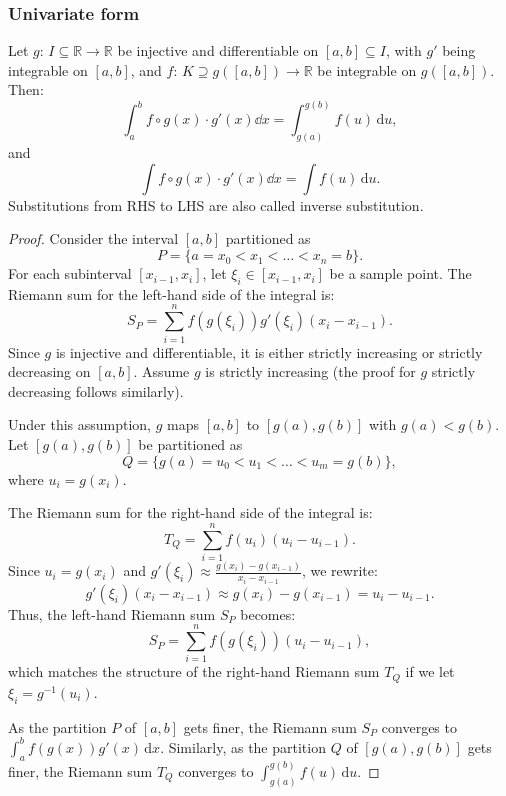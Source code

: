 \subsubsection{Univariate form}
Let $g:\,I\subseteq\mathbb{R}\to\mathbb{R}$ be injective and differentiable on $[a,b]\subseteq I$, with $g'$ being integrable on $[a,b]$, and $f:\,K\supseteq g([a,b])\to\mathbb{R}$ be integrable on $g([a,b])$. Then:
\[\int_a^bf\circ g(x)\cdot g'(x)\dd{x}=\int_{g(a)}^{g(b)}f(u)\,\mathrm{d}u,\]
and
\[\int f\circ g(x)\cdot g'(x)\dd{x}=\int f(u)\,\mathrm{d}u.\]
Substitutions from RHS to LHS are also called inverse substitution.
\begin{proof}
Consider the interval \([a, b]\) partitioned as
\[P = \{a = x_0 < x_1 < \dots  < x_n = b\}.\]
For each subinterval \([x_{i-1}, x_i]\), let \(\xi_i \in [x_{i-1}, x_i]\) be a sample point. The Riemann sum for the left-hand side of the integral is:
\[S_P = \sum_{i=1}^n f(g(\xi_i)) g'(\xi_i) (x_i - x_{i-1}).\]
Since \(g\) is injective and differentiable, it is either strictly increasing or strictly decreasing on \([a, b]\). Assume \(g\) is strictly increasing (the proof for \(g\) strictly decreasing follows similarly).

Under this assumption, \(g\) maps \([a, b]\) to \([g(a), g(b)]\) with \(g(a) < g(b)\). Let \([g(a), g(b)]\) be partitioned as
\[Q = \{g(a) = u_0 < u_1 < \dots  < u_m = g(b)\},\]
where \(u_i = g(x_i)\).

The Riemann sum for the right-hand side of the integral is:
\[T_Q = \sum_{i=1}^n f(u_i) (u_i - u_{i-1}).\]
Since \(u_i = g(x_i)\) and \(g'(\xi_i) \approx \frac{g(x_i) - g(x_{i-1})}{x_i - x_{i-1}}\), we rewrite:
\[ g'(\xi_i) (x_i - x_{i-1}) \approx g(x_i) - g(x_{i-1}) = u_i - u_{i-1}. \]
Thus, the left-hand Riemann sum \(S_P\) becomes:
\[ S_P = \sum_{i=1}^n f(g(\xi_i)) (u_i - u_{i-1}),\]
which matches the structure of the right-hand Riemann sum \(T_Q\) if we let \(\xi_i = g^{-1}(u_i)\).

As the partition \(P\) of \([a, b]\) gets finer, the Riemann sum \(S_P\) converges to \(\int_a^b f(g(x)) g'(x) \, \mathrm{d}x\). Similarly, as the partition \(Q\) of \([g(a), g(b)]\) gets finer, the Riemann sum \(T_Q\) converges to \(\int_{g(a)}^{g(b)} f(u) \, \mathrm{d}u\).
\end{proof}
